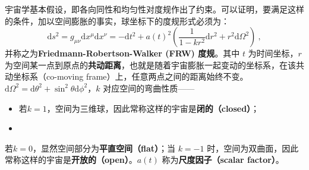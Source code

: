 
宇宙学基本假设，即各向同性和均匀性对度规作出了约束。可以证明，要满足这样的条件，加以空间膨胀的事实，球坐标下的度规形式必须为：
\begin{equation}
\mathrm{d}s^2=g_{\mu\nu}\mathrm{d}x^{\mu}\mathrm{d}x^{\nu}=-\mathrm{d}t^2+a(t)^2 \left( \frac{1}{1-kr^2}\mathrm{d}r^2+r^2 \mathrm{d} \Omega^2\right)~,
\end{equation}
并称之为\textbf{Friedmann-Robertson-Walker (FRW) 度规}。其中 $t$ 为时间坐标，$r$ 为空间某一点到原点的\textbf{共动距离}，也就是随着宇宙膨胀一起变动的坐标系，在该共动坐标系（co-moving frame）上，任意两点之间的距离始终不变。
$\mathrm{d} \Omega^2 =\mathrm{d} \theta^2 + \sin^2\theta\mathrm{d} \phi^2 $，$k$ 对应空间的弯曲性质——
\begin{itemize}
\item 若$k=1$，空间为三维球，因此常称这样的宇宙是\textbf{闭的（closed）}；
\item 
\end{itemize}
若$k=0$，显然空间部分为\textbf{平直空间（flat）}；当 $k=-1$ 时，空间为双曲面，因此常称这样的宇宙是\textbf{开放的（open）}。$a(t)$ 称为\textbf{尺度因子（scalar factor）}。
